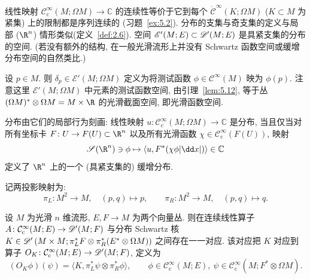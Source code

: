 线性映射 $\mathcal{C}_{\mathrm{c}}^\infty(M; \Omega M) \to \mathbb{C}$ 的连续性等价于它到每个 $\dot{\mathcal{C}}^\infty(K; \Omega M)$ ($K \subset M$ 为紧集) 上的限制都是序列连续的 (习题~\ref{ex:5.2}). 分布的支集与奇支集的定义与局部 ($\R^n$) 情形类似(定义~\ref{def:2.6}). 空间 $\mathscr{E}'(M; E) \subset \mathscr{D}'(M; E)$ 是具紧支集的分布的空间. (若没有额外的结构, 在一般光滑流形上并没有 Schwartz 函数空间或缓增分布空间的自然类比.)

\begin{example}\label{eg:5.17}
设 $p \in M$. 则 $\delta_p \in \mathscr{E}'(M; \Omega M)$ 定义为将测试函数 $\phi \in \mathcal{C}^\infty(M)$ 映为 $\phi(p)$. 注意这里 $\mathscr{E}'(M; \Omega M)$ 中元素的测试函数空间, 由引理~\ref{lem:5.12}, 等于丛 $(\Omega M)^* \otimes \Omega M = M \times \R$ 的光滑截面空间, 即光滑函数空间.
\end{example}

分布由它们的局部行为刻画: 线性映射 $u \colon \mathcal{C}_{\mathrm{c}}^\infty(M; \Omega M) \to \mathbb{C}$ 是分布, 当且仅当对所有坐标卡 $F \colon U \to F(U) \subset \R^n$ 以及所有光滑函数 $\chi \in \mathcal{C}_{\mathrm{c}}^\infty(F(U))$, 映射
\begin{equation}\label{eq:5.43}
    \Schwartz(\R^n) \ni \phi \mapsto \langle u, F^*(\chi \phi |\dd x|) \rangle \in \mathbb{C}
\end{equation}
定义了 $\R^n$ 上的一个 (具紧支集的) 缓增分布.

记两投影映射为: \begin{equation}\label{eq:5.44}\pi_L \colon M^2 \to M, \quad (p, q) \mapsto p, \qquad \pi_R \colon M^2 \to M, \quad (p, q) \mapsto q.\end{equation}

\begin{theorem}\label{thm:5.18}
设 $M$ 为光滑 $n$ 维流形, $E, F \to M$ 为两个向量丛. 则在连续线性算子 $A \colon \mathcal{C}_{\mathrm{c}}^\infty(M; E) \to \mathscr{D}'(M; F)$ 与分布 Schwartz 核 $K \in \mathscr{D}'\left( M \times M; \pi_L^* F \otimes \pi_R^*(E^* \otimes \Omega M) \right)$ 之间存在一一对应. 该对应把 $K$ 对应到算子 $O_K \colon \mathcal{C}_{\mathrm{c}}^\infty(M; E) \to \mathscr{D}'(M; F)$, 定义为
\begin{equation}\label{eq:5.45}
    (O_K \phi)(\psi) = \langle K, \pi_L^* \psi \otimes \pi_R^* \phi \rangle, \qquad \phi \in \mathcal{C}_{\mathrm{c}}^\infty(M; E), \ \psi \in \mathcal{C}_{\mathrm{c}}^\infty(M; F^* \otimes \Omega M).
\end{equation}
\end{theorem}

